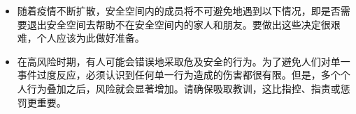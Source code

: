 \documentclass[onecolumn,journal]{IEEEtran}
\begin{document}
\begin{multicols}{2}
\begin{itemize}
\item 随着疫情不断扩散，安全空间内的成员将不可避免地遇到以下情况，即是否需要退出安全空间去帮助不在安全空间内的家人和朋友。要做出这些决定很艰难，个人应该为此做好准备。

\item 在高风险时期，有人可能会错误地采取危及安全的行为。为了避免人们对单一事件过度反应，必须认识到任何单一行为造成的伤害都很有限。但是，多个个人行为叠加之后，风险就会显著增加。请确保吸取教训，这比指控、指责或惩罚更重要。

\end{itemize}



\end{multicols}



% 
\end{document}

